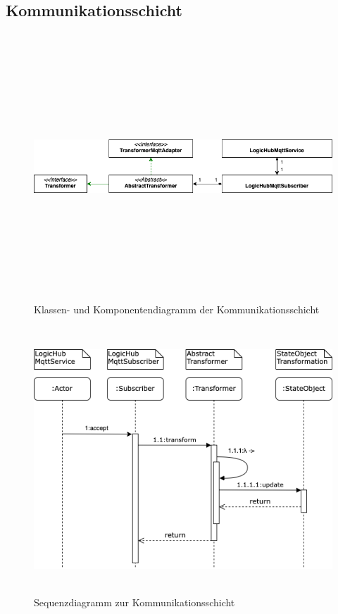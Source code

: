    \subsection{Kommunikationsschicht}
    \begin{figure}[hbt!]
        \centering
        \includegraphics[width=14cm,height=10cm,keepaspectratio]{images/Kommunikationsschicht_final.png}
        \caption{Klassen- und Komponentendiagramm der Kommunikationsschicht}
        \label{fig:patternkommunikation}
    \end{figure}
    \begin{figure}[hbt!]
        \centering
        \includegraphics[width=14cm,height=10cm,keepaspectratio]{images/Kommunikationsschicht_Sequenz_Final.png}
        \caption{Sequenzdiagramm zur Kommunikationsschicht}
        \label{fig:kommunikationsequenz}
    \end{figure}

